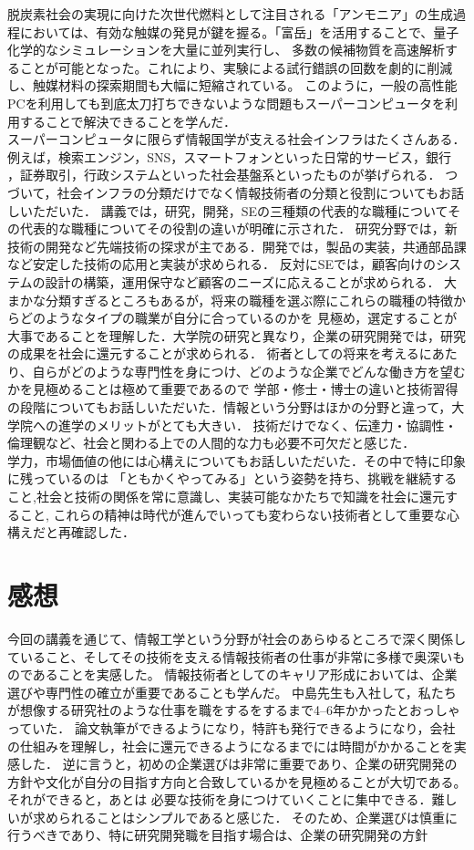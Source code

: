\documentclass[autodetect-engine,dvi=dvipdfmx,ja=standard,
               a4j,11pt]{bxjsarticle}
\begin{document}
脱炭素社会の実現に向けた次世代燃料として注目される「アンモニア」の生成過程においては、有効な触媒の発見が鍵を握る。「富岳」を活用することで、量子化学的なシミュレーションを大量に並列実行し、
多数の候補物質を高速解析することが可能となった。これにより、実験による試行錯誤の回数を劇的に削減し、触媒材料の探索期間も大幅に短縮されている。
このように，一般の高性能PCを利用しても到底太刀打ちできないような問題もスーパーコンピュータを利用することで解決できることを学んだ．\\
スーパーコンピュータに限らず情報国学が支える社会インフラはたくさんある．例えば，検索エンジン，SNS，スマートフォンといった日常的サービス，銀行
，証券取引，行政システムといった社会基盤系といったものが挙げられる．
つづいて，社会インフラの分類だけでなく情報技術者の分類と役割についてもお話しいただいた．
講義では，研究，開発，SEの三種類の代表的な職種についてその代表的な職種についてその役割の違いが明確に示された．
研究分野では，新技術の開発など先端技術の探求が主である．開発では，製品の実装，共通部品課など安定した技術の応用と実装が求められる．
反対にSEでは，顧客向けのシステムの設計の構築，運用保守など顧客のニーズに応えることが求められる．
大まかな分類すぎるところもあるが，将来の職種を選ぶ際にこれらの職種の特徴からどのようなタイプの職業が自分に合っているのかを
見極め，選定することが大事であることを理解した．大学院の研究と異なり，企業の研究開発では，研究の成果を社会に還元することが求められる．
術者としての将来を考えるにあたり、自らがどのような専門性を身につけ、どのような企業でどんな働き方を望むかを見極めることは極めて重要であるので
学部・修士・博士の違いと技術習得の段階についてもお話しいただいた．情報という分野はほかの分野と違って，大学院への進学のメリットがとても大きい．
技術だけでなく、伝達力・協調性・倫理観など、社会と関わる上での人間的な力も必要不可欠だと感じた．
\\
学力，市場価値の他には心構えについてもお話しいただいた．その中で特に印象に残っているのは
「ともかくやってみる」という姿勢を持ち、挑戦を継続すること,社会と技術の関係を常に意識し、実装可能なかたちで知識を社会に還元すること,
これらの精神は時代が進んでいっても変わらない技術者として重要な心構えだと再確認した．
\section{感想}
今回の講義を通じて、情報工学という分野が社会のあらゆるところで深く関係していること、そしてその技術を支える情報技術者の仕事が非常に多様で奥深いものであることを実感した。
情報技術者としてのキャリア形成においては、企業選びや専門性の確立が重要であることも学んだ。
中島先生も入社して，私たちが想像する研究社のような仕事を職をするをするまで4--6年かかったとおっしゃっていた．
論文執筆ができるようになり，特許も発行できるようになり，会社の仕組みを理解し，社会に還元できるようになるまでには時間がかかることを実感した．
逆に言うと，初めの企業選びは非常に重要であり、企業の研究開発の方針や文化が自分の目指す方向と合致しているかを見極めることが大切である。それができると，あとは
必要な技術を身につけていくことに集中できる．難しいが求められることはシンプルであると感じた．
そのため、企業選びは慎重に行うべきであり、特に研究開発職を目指す場合は、企業の研究開発の方針
\end{document}
